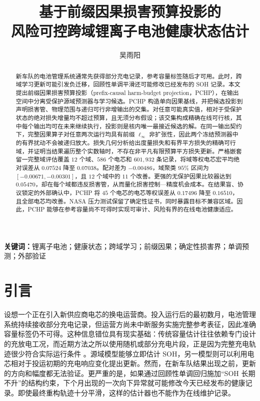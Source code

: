 \documentclass[UTF8,11pt]{ctexart}
\title{\textbf{基于前缀因果损害预算投影的\\风险可控跨域锂离子电池健康状态估计}}
\author{吴雨阳}
\date{}
\begin{document}
\maketitle

\begin{abstract}
新车队的电池管理系统通常先获得部分充电记录，参考容量标签随后才可用。此时，跨域学习更新可能引发负迁移，回顾性单调平滑还可能修改已经发布的 SOH 记录。本文提出前缀因果损害预算投影（prefix-causal harm-budget projection，PCHP），在输出空间中分离受保护源域预测器与学习候选。PCHP 构造单向因果基线，并把候选投影到声明损害管、物理范围与递归可行非增输出的交集。对任意可能真实值，相对于受保护状态的绝对损失增量均不超过预算，且无须分布假设；该交集构成精确在线可行核，其中每个输出均可在未来继续执行，投影则是核内唯一最接近候选的解。在同一输出契约下，完整因果算子对任意两次运行均具有前缀 $\ell_\infty$ 非扩张性，因此两个冻结预测器中的有界扰动不会被递归放大。损失几何分析给出度量损失和有界平方损失的精确可行域，并证明当结果遍历整个实数轴时，不存在非平凡有限预算平方损失更新。严格嵌套留一完整域评估覆盖 $12$ 个域、$586$ 个电芯和 $601{,}932$ 条记录，将域等权电芯宏平均绝对误差从 $0.07524$ 降至 $0.07038$。配对差为 $-0.00486$，域聚类 $95\%$ 区间为 $[-0.00671,-0.00301]$，且 $12$ 个域中的 $11$ 个改善。更强的无保护因果比较器达到 $0.05470$，却在每个域都违反损害管，从而量化损害控制—精度机会成本。在结果盲、协议锁定的外部确认中，PCHP 将 $45$ 个电芯的电芯等权误差从 $0.17496$ 降至 $0.16510$，且全部电芯均改善。NASA 压力测试保留了确定性证书，同时暴露目标不兼容区域。因此，PCHP 能够在参考容量尚不可得时实现可审计、风险有界的在线电池健康适应。
\end{abstract}

\noindent\textbf{关键词：}锂离子电池；健康状态；跨域学习；前缀因果；确定性损害界；单调预测；外部验证

\section{引言}

设想一个正在引入新供应商电芯的换电运营商。投入运行后的最初数月，电池管理系统持续接收部分充电记录，但运营方尚未中断服务实施完整参考表征，因此准确容量标签仍不可得。这种信息错位具有现实基础：传统容量估计往往依赖专门设计的充放电工况，而近期方法之所以使用随机或部分充电片段，正是因为完整充电轨迹很少符合实际运行条件 \citep{liu2023rapid,zhang2024flexible}。源域模型能够立即估计 SOH，另一模型则可以利用电芯相对于投运初期的充电响应变化提出更新。然而，在新车队结果出现之前，更新的方向和幅度都无法验证。更严重的是，如果通过回顾性单调回归施加“SOH 长期不升”的结构约束，下个月出现的一次向下异常就可能修改今天已经发布的健康记录。即使最终重构轨迹十分平滑，这样的估计器也不能作为在线维护记录。
\end{document}
